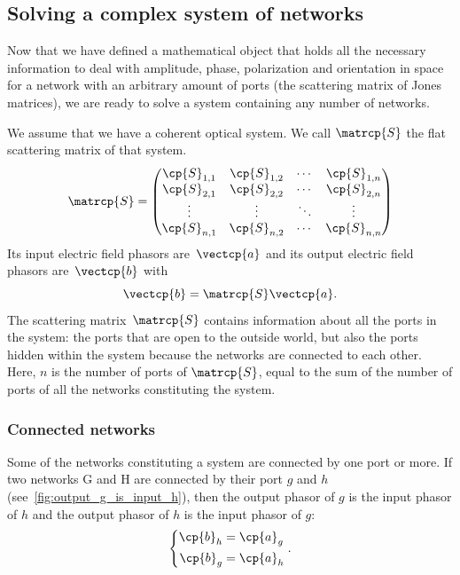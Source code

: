 \begin{refsection}
\subsection{Solving a complex system of networks}
\label{sec:solving_a_system}
Now that we have defined a mathematical object that holds all the necessary information to deal with amplitude, phase, polarization and orientation in space for a network with an arbitrary amount of ports (the scattering matrix of Jones matrices), we are ready to solve a system containing any number of networks.

We assume that we have a coherent optical system.
We call $\matrcp{S}$ the flat scattering matrix of that system.
\begin{equation*}
    \matrcp{S} =
    \begin{pmatrix}
        \cp{S}_{1, 1} & \cp{S}_{1, 2} & \cdots & \cp{S}_{1, n} \\
        \cp{S}_{2, 1} & \cp{S}_{2, 2} & \cdots & \cp{S}_{2, n} \\
        \vdots   & \vdots   & \ddots & \vdots \\
        \cp{S}_{n, 1} & \cp{S}_{n, 2} & \cdots & \cp{S}_{n, n}
    \end{pmatrix}
\end{equation*}
Its input electric field phasors are~$\vectcp{a}$ and its output electric field phasors are~$\vectcp{b}$ with
\begin{equation*}
    \vectcp{b} = \matrcp{S} \vectcp{a}
    \text{.}
\end{equation*}
The scattering matrix~$\matrcp{S}$ contains information about all the ports in the system: the ports that are open to the outside world, but also the ports hidden within the system because the networks are connected to each other.
Here, $n$ is the number of ports of $\matrcp{S}$, equal to the sum of the number of ports of all the networks constituting the system.




\subsubsection{Connected networks}

Some of the networks constituting a system are connected by one port or more.
If two networks G and H are connected by their port $g$ and $h$ (see~\cref{fig:output_g_is_input_h}), then the output phasor of $g$ is the input phasor of $h$ and the output phasor of $h$ is the input phasor of $g$:
\begin{equation}
    \left\lbrace
    \begin{aligned}
        \cp{b}_h &= \cp{a}_g \\
        \cp{b}_g &= \cp{a}_h
    \end{aligned}
    \right.
    \label{eq:connected_inputs_outputs}
    \text{.}
\end{equation}


\end{refsection}
